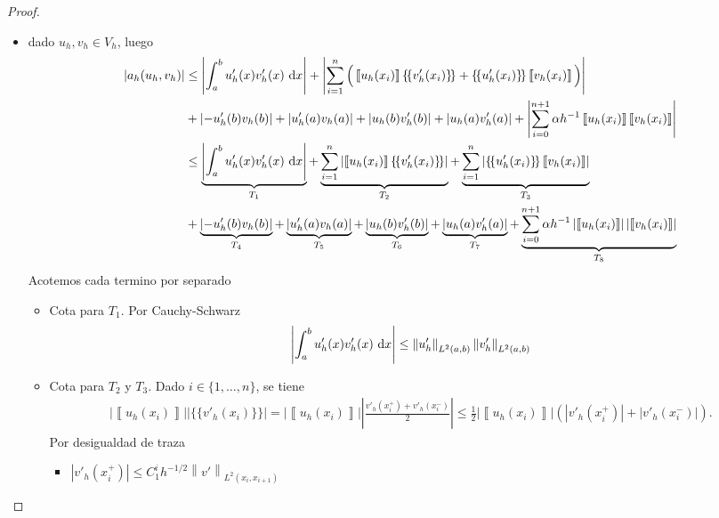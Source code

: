 \documentclass[10pt,a4paper]{report}
\newcommand{\dx}{\textup{d}x}
\providecommand{\abs}[1]{\left\lvert#1\right\rvert}
\providecommand{\norm}[1]{\left\lVert#1\right\rVert}
\providecommand{\salto}[1]{\left\llbracket#1\right\rrbracket}
\providecommand{\prom}[1]{\{\!\{#1\}\!\}}
\begin{document}
    \begin{proof}
    	\begin{itemize}
    		\item[$(a)$] dado $u_{h},v_{h}\in V_{h}$, luego\\
    		\begin{align*}
    			\abs{a_{h}(u_{h},v_{h})} &\leq \abs{\int_{a}^{b} u'_{h}(x)v'_{h}(x)\ \dx}  + \abs{ \sum_{i=1}^{n}\Big(\salto{u_{h}(x_{i})}\prom{v'_{h}(x_{i})} + \prom{u'_{h}(x_{i})}\salto{v_{h}(x_{i})}\Big)}\\
    				&+\abs{-u'_{h}(b)v_{h}(b)} + \abs{u'_{h}(a)v_{h}(a)} + \abs{u_{h}(b)v'_{h}(b)} + \abs{u_{h}(a)v'_{h}(a)} + \abs{\sum_{i=0}^{n+1}\alpha h^{-1}\salto{u_{h}(x_{i})}\salto{v_{h}(x_{i})}}\\
    				&\leq \underbrace{\abs{\int_{a}^{b} u'_{h}(x)v'_{h}(x)\ \dx}}_{T_1}  +  \underbrace{\sum_{i=1}^{n}\abs{\salto{u_{h}(x_{i})}\prom{v'_{h}(x_{i})}}}_{T_2} + \underbrace{\sum_{i=1}^{n}\abs{\prom{u'_{h}(x_{i})}\salto{v_{h}(x_{i})}}}_{T_3}\\
    				&+\underbrace{\abs{-u'_{h}(b)v_{h}(b)}}_{T_4} + \underbrace{\abs{u'_{h}(a)v_{h}(a)}}_{T_{5}} + \underbrace{\abs{u_{h}(b)v'_{h}(b)}}_{T_{6}} + \underbrace{\abs{u_{h}(a)v'_{h}(a)}}_{T_7} + \underbrace{\sum_{i=0}^{n+1}\alpha h^{-1}\abs{\salto{u_{h}(x_{i})}}\abs{\salto{v_{h}(x_{i})}}}_{T_8}\\	
    		\end{align*}
    	    Acotemos cada termino por separado
    	    \begin{itemize}
    	    	\item[$1)$] Cota para $T_{1}$. Por Cauchy-Schwarz
    	    	\begin{align*}
    	    		\abs{\int_{a}^{b} u'_{h}(x)v'_{h}(x)\ \dx} \leq \norm{u'_{h}}_{L^{2}(a,b)}\norm{v'_{h}}_{L^{2}(a,b)}
    	    	\end{align*}
    	    	\item[$2)$] Cota para $T_{2}$ y $T_{3}$. Dado $i\in\{1,\dots,n\}$, se tiene
    	    	\begin{align*}
    	    		\abs{\salto{u_{h}(x_{i})}}\abs{\prom{v'_{h}(x_{i})}} = \abs{\salto{u_{h}(x_{i})}}\abs{\frac{v'_{h}(x^{+}_{i})+v'_{h}(x^{-}_{i})}{2}} \leq \frac{1}{2}\abs{\salto{u_{h}(x_{i})}}\left(\abs{v'_{h}(x^{+}_{i})} + \abs{v'_{h}(x^{-}_{i})}\right).
    	    	\end{align*}
        	    Por desigualdad de traza
        	    \begin{itemize}
        	    	\item $\abs{v'_{h}(x^{+}_{i})} \leq C^{i}_{1}h^{-1/2}\norm{v'}_{L^{2}(x_{i},x_{i+1})}$

\end{itemize}
\end{itemize}
\end{itemize}
\end{proof}
\end{document}
